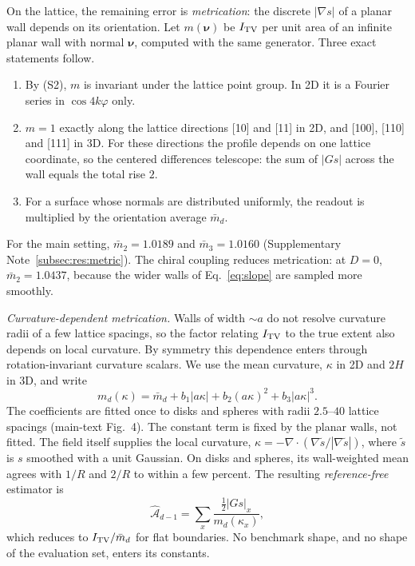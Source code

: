 \documentclass[11pt,a4paper]{article}
\begin{document}
On the lattice, the remaining error is \emph{metrication}: the discrete $|\nabla s|$ of a planar wall depends on its orientation. Let $m(\bm\nu)$ be $I_{\rm TV}$ per unit area of an infinite planar wall with normal $\bm\nu$, computed with the same generator. Three exact statements follow.
\begin{enumerate}[label=(\alph*),leftmargin=2em,itemsep=0.1em]
\item By (S2), $m$ is invariant under the lattice point group. In 2D it is a Fourier series in $\cos4k\varphi$ only.
\item $m=1$ exactly along the lattice directions [10] and [11] in 2D, and [100], [110] and [111] in 3D. For these directions the profile depends on one lattice coordinate, so the centered differences telescope: the sum of $|Gs|$ across the wall equals the total rise $2$.
\item For a surface whose normals are distributed uniformly, the readout is multiplied by the orientation average $\bar m_d$.
\end{enumerate}
For the main setting, $\bar m_2=1.0189$ and $\bar m_3=1.0160$ (Supplementary Note~\ref{subsec:res:metric}). The chiral coupling reduces metrication: at $D=0$, $\bar m_2=1.0437$, because the wider walls of Eq.~\eqref{eq:slope} are sampled more smoothly.

\emph{Curvature-dependent metrication.} Walls of width $\sim a$ do not resolve curvature radii of a few lattice spacings, so the factor relating $I_{\rm TV}$ to the true extent also depends on local curvature. By symmetry this dependence enters through rotation-invariant curvature scalars. We use the mean curvature, $\kappa$ in 2D and $2H$ in 3D, and write
\begin{equation}
 m_d(\kappa)=\bar m_d+b_1|a\kappa|+b_2(a\kappa)^2+b_3|a\kappa|^3 .
 \label{eq:mkappa}
\end{equation}
The coefficients are fitted once to disks and spheres with radii $2.5$--$40$ lattice spacings (main-text Fig.~4). The constant term is fixed by the planar walls, not fitted. The field itself supplies the local curvature, $\kappa=-\nabla\cdot(\nabla\tilde s/|\nabla\tilde s|)$, where $\tilde s$ is $s$ smoothed with a unit Gaussian. On disks and spheres, its wall-weighted mean agrees with $1/R$ and $2/R$ to within a few percent. The resulting \emph{reference-free} estimator is
\begin{equation}
 \widehat{\mathcal A}_{d-1}=\sum_x\frac{\tfrac12|Gs|_x}{m_d(\kappa_x)} ,
 \label{eq:refree}
\end{equation}
which reduces to $I_{\rm TV}/\bar m_d$ for flat boundaries. No benchmark shape, and no shape of the evaluation set, enters its constants.
\end{document}
